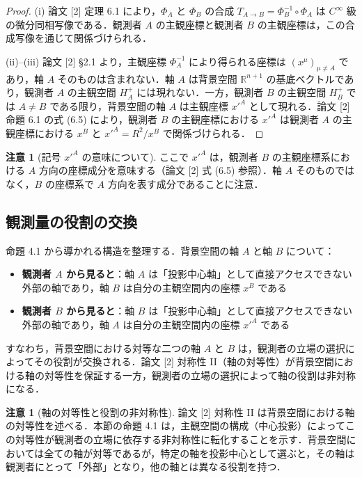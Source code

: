 \documentclass[a4paper,11pt]{ltjsarticle}
\theoremstyle{definition}
\newtheorem{remark}[theorem]{注意}
\begin{document}
\begin{proof}
(i) 論文 {[2]} 定理 6.1 により，\(\Phi_A\) と \(\Phi_B\) の合成 \(T_{A \to B} = \Phi_B^{-1} \circ \Phi_A\) は \(C^\infty\) 級の微分同相写像である．観測者 \(A\) の主観座標と観測者 \(B\) の主観座標は，この合成写像を通じて関係づけられる．

(ii)--(iii) 論文 {[2]} \S2.1 より，主観座標 \(\Phi_A^{-1}\) により得られる座標は \((x^\mu)_{\mu \neq A}\) であり，軸 \(A\) そのものは含まれない．軸 \(A\) は背景空間 \(\mathbb{R}^{n+1}\) の基底ベクトルであり，観測者 \(A\) の主観空間 \(H_A^+\) には現れない．一方，観測者 \(B\) の主観空間 \(H_B^+\) では \(A \neq B\) である限り，背景空間の軸 \(A\) は主観座標 \(x'^A\) として現れる．論文 {[2]} 命題 6.1 の式 (6.5) により，観測者 \(B\) の主観座標における \(x'^A\) は観測者 \(A\) の主観座標における \(x^B\) と \(x'^A = R^2/x^B\) で関係づけられる．
\end{proof}

\begin{remark}[記号 \(x'^A\) の意味について]
ここで \(x'^A\) は，観測者 \(B\) の主観座標系における \(A\) 方向の座標成分を意味する（論文 {[2]} 式 (6.5) 参照）．軸 \(A\) そのものではなく，\(B\) の座標系で \(A\) 方向を表す成分であることに注意．
\end{remark}

\subsection{観測量の役割の交換}

命題 4.1 から導かれる構造を整理する．背景空間の軸 \(A\) と軸 \(B\) について：

\begin{itemize}
\item \textbf{観測者 \(A\) から見ると}：軸 \(A\) は「投影中心軸」として直接アクセスできない外部の軸であり，軸 \(B\) は自分の主観空間内の座標 \(x^B\) である
\item \textbf{観測者 \(B\) から見ると}：軸 \(B\) は「投影中心軸」として直接アクセスできない外部の軸であり，軸 \(A\) は自分の主観空間内の座標 \(x'^A\) である
\end{itemize}

すなわち，背景空間における対等な二つの軸 \(A\) と \(B\) は，観測者の立場の選択によってその役割が交換される．論文 {[2]} 対称性 II（軸の対等性）が背景空間における軸の対等性を保証する一方，観測者の立場の選択によって軸の役割は非対称になる．

\begin{remark}[軸の対等性と役割の非対称性]
論文 {[2]} 対称性 II は背景空間における軸の対等性を述べる．本節の命題 4.1 は，主観空間の構成（中心投影）によってこの対等性が観測者の立場に依存する非対称性に転化することを示す．背景空間においては全ての軸が対等であるが，特定の軸を投影中心として選ぶと，その軸は観測者にとって「外部」となり，他の軸とは異なる役割を持つ．
\end{remark}
\end{document}
